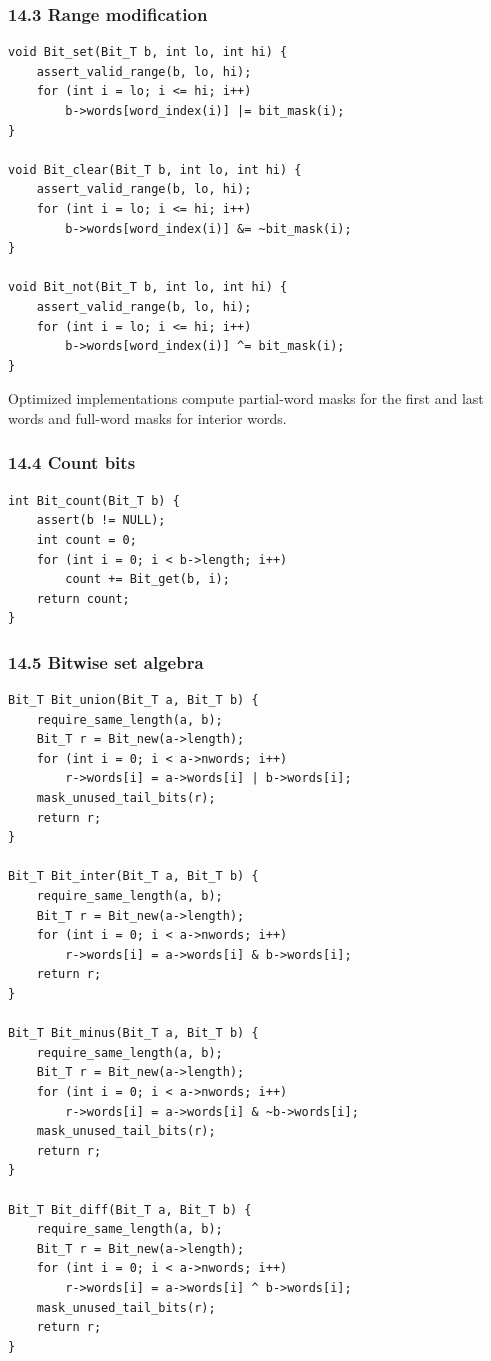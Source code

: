 \documentclass[11pt]{article}
\begin{document}
\subsubsection{14.3 Range modification}\label{range-modification}

\begin{verbatim}
void Bit_set(Bit_T b, int lo, int hi) {
    assert_valid_range(b, lo, hi);
    for (int i = lo; i <= hi; i++)
        b->words[word_index(i)] |= bit_mask(i);
}

void Bit_clear(Bit_T b, int lo, int hi) {
    assert_valid_range(b, lo, hi);
    for (int i = lo; i <= hi; i++)
        b->words[word_index(i)] &= ~bit_mask(i);
}

void Bit_not(Bit_T b, int lo, int hi) {
    assert_valid_range(b, lo, hi);
    for (int i = lo; i <= hi; i++)
        b->words[word_index(i)] ^= bit_mask(i);
}
\end{verbatim}

Optimized implementations compute partial-word masks for the first and last words and full-word masks for interior words.

\subsubsection{14.4 Count bits}\label{count-bits}

\begin{verbatim}
int Bit_count(Bit_T b) {
    assert(b != NULL);
    int count = 0;
    for (int i = 0; i < b->length; i++)
        count += Bit_get(b, i);
    return count;
}
\end{verbatim}

\subsubsection{14.5 Bitwise set algebra}\label{bitwise-set-algebra}

\begin{verbatim}
Bit_T Bit_union(Bit_T a, Bit_T b) {
    require_same_length(a, b);
    Bit_T r = Bit_new(a->length);
    for (int i = 0; i < a->nwords; i++)
        r->words[i] = a->words[i] | b->words[i];
    mask_unused_tail_bits(r);
    return r;
}

Bit_T Bit_inter(Bit_T a, Bit_T b) {
    require_same_length(a, b);
    Bit_T r = Bit_new(a->length);
    for (int i = 0; i < a->nwords; i++)
        r->words[i] = a->words[i] & b->words[i];
    return r;
}

Bit_T Bit_minus(Bit_T a, Bit_T b) {
    require_same_length(a, b);
    Bit_T r = Bit_new(a->length);
    for (int i = 0; i < a->nwords; i++)
        r->words[i] = a->words[i] & ~b->words[i];
    mask_unused_tail_bits(r);
    return r;
}

Bit_T Bit_diff(Bit_T a, Bit_T b) {
    require_same_length(a, b);
    Bit_T r = Bit_new(a->length);
    for (int i = 0; i < a->nwords; i++)
        r->words[i] = a->words[i] ^ b->words[i];
    mask_unused_tail_bits(r);
    return r;
}
\end{verbatim}
\end{document}
